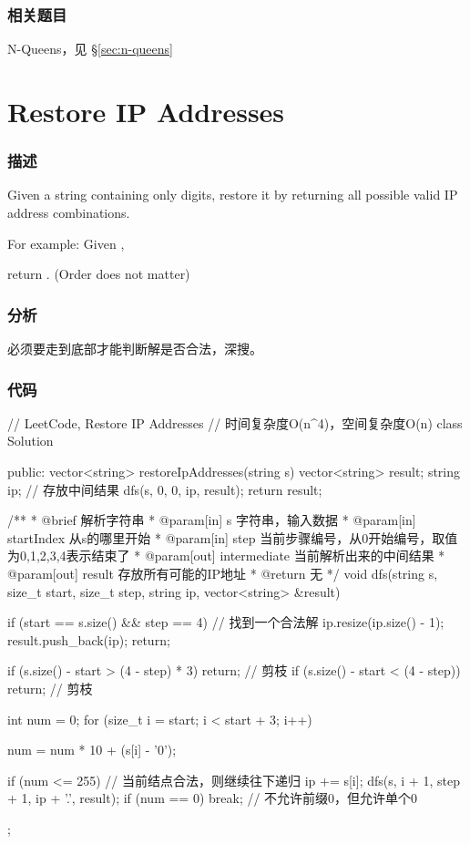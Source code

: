 \subsubsection{相关题目}
\begindot
\item N-Queens，见 \S \ref{sec:n-queens}
\myenddot


\section{Restore IP Addresses} %
\label{sec:restore-ip-addresses}


\subsubsection{描述}
Given a string containing only digits, restore it by returning all possible valid IP address combinations.

For example:
Given ,

return \code{["255.255.11.135", "255.255.111.35"]}. (Order does not matter)


\subsubsection{分析}
必须要走到底部才能判断解是否合法，深搜。


\subsubsection{代码}
\begin{Code}
// LeetCode, Restore IP Addresses
// 时间复杂度O(n^4)，空间复杂度O(n)
class Solution {
public:
    vector<string> restoreIpAddresses(string s) {
        vector<string> result;
        string ip; // 存放中间结果
        dfs(s, 0, 0, ip, result);
        return result;
    }

    /**
     * @brief 解析字符串
     * @param[in] s 字符串，输入数据
     * @param[in] startIndex 从s的哪里开始
     * @param[in] step 当前步骤编号，从0开始编号，取值为0,1,2,3,4表示结束了
     * @param[out] intermediate 当前解析出来的中间结果
     * @param[out] result 存放所有可能的IP地址
     * @return 无
     */
    void dfs(string s, size_t start, size_t step, string ip,
            vector<string> &result) {
        if (start == s.size() && step == 4) {  // 找到一个合法解
            ip.resize(ip.size() - 1);
            result.push_back(ip);
            return;
        }

        if (s.size() - start > (4 - step) * 3)
            return;  // 剪枝
        if (s.size() - start < (4 - step))
            return;  // 剪枝

        int num = 0;
        for (size_t i = start; i < start + 3; i++) {
            num = num * 10 + (s[i] - '0');

            if (num <= 255) {  // 当前结点合法，则继续往下递归
                ip += s[i];
                dfs(s, i + 1, step + 1, ip + '.', result);
            }
            if (num == 0) break;  // 不允许前缀0，但允许单个0
        }
    }
};
\end{Code}


